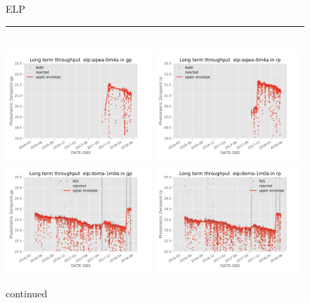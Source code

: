 \documentclass[]{spie}
\begin{document}
\begin{figure}
ELP  \\ 
\rule{\textwidth}{0.4pt} \\
\includegraphics[width=0.49\textwidth]{images/photzptrend-elp-aqwa-0m4a-gp.png} \hspace*{\fill}
\includegraphics[width=0.49\textwidth]{images/photzptrend-elp-aqwa-0m4a-rp.png} \\
\includegraphics[width=0.49\textwidth]{images/photzptrend-elp-doma-1m0a-gp.png} \hspace*{\fill}
\includegraphics[width=0.49\textwidth]{images/photzptrend-elp-doma-1m0a-rp.png} \\[1ex]
\caption {continued}
\end{figure}
\end{document}
